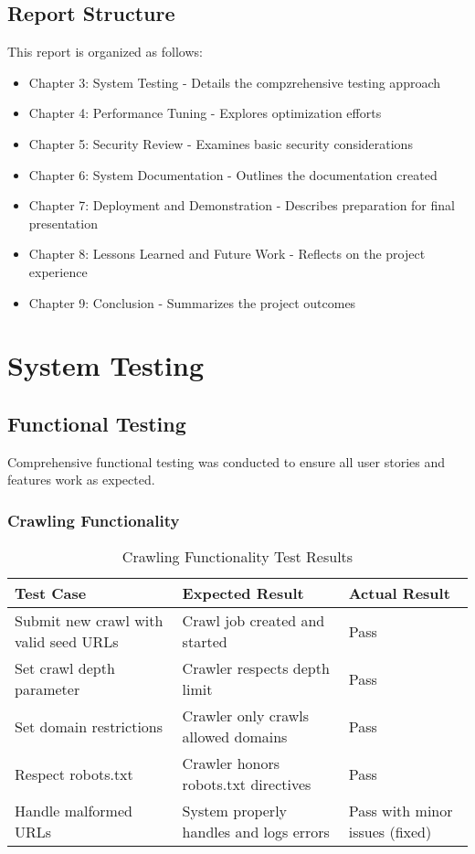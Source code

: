 \documentclass[12pt,a4paper]{report}
\begin{document}
\section{Report Structure}
This report is organized as follows:
\begin{itemize}
    \item Chapter 3: System Testing - Details the compzrehensive testing approach
    \item Chapter 4: Performance Tuning - Explores optimization efforts
    \item Chapter 5: Security Review - Examines basic security considerations
    \item Chapter 6: System Documentation - Outlines the documentation created
    \item Chapter 7: Deployment and Demonstration - Describes preparation for final presentation
    \item Chapter 8: Lessons Learned and Future Work - Reflects on the project experience
    \item Chapter 9: Conclusion - Summarizes the project outcomes
\end{itemize}

\chapter{System Testing}

\section{Functional Testing}
Comprehensive functional testing was conducted to ensure all user stories and features work as expected.

\subsection{Crawling Functionality}
\begin{table}[H]
    \centering
    \begin{tabularx}{\textwidth}{|X|X|X|}
        \hline
        \textbf{Test Case} & \textbf{Expected Result} & \textbf{Actual Result} \\
        \hline
        Submit new crawl with valid seed URLs & Crawl job created and started & Pass \\
        \hline
        Set crawl depth parameter & Crawler respects depth limit & Pass \\
        \hline
        Set domain restrictions & Crawler only crawls allowed domains & Pass \\
        \hline
        Respect robots.txt & Crawler honors robots.txt directives & Pass \\
        \hline
        Handle malformed URLs & System properly handles and logs errors & Pass with minor issues (fixed) \\
        \hline
    \end{tabularx}
    \caption{Crawling Functionality Test Results}
\end{table}
\end{document}
